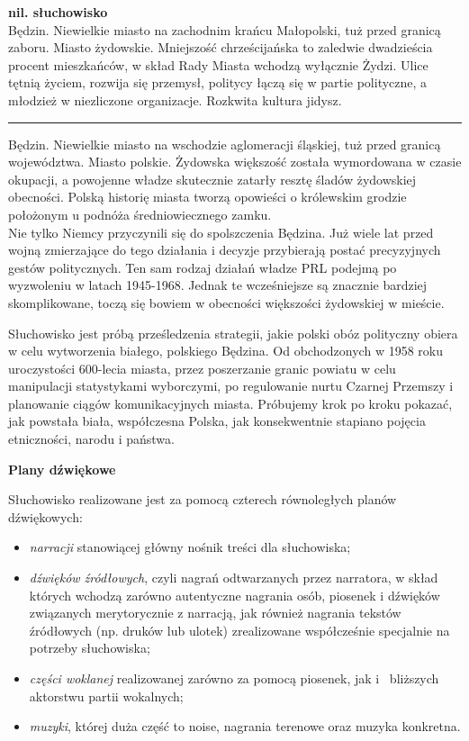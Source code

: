 \documentclass[11pt,a4paper,oneside]{article}
\begin{document}
\textbf{nil. słuchowisko}
\\

Będzin. Niewielkie miasto na zachodnim krańcu Małopolski, tuż przed
granicą zaboru. Miasto żydowskie. Mniejszość chrześcijańska to zaledwie
dwadzieścia procent mieszkańców, w skład Rady Miasta wchodzą wyłącznie
Żydzi. Ulice tętnią życiem, rozwija się przemysł, politycy łączą się w
partie polityczne, a młodzież w niezliczone organizacje. Rozkwita
kultura jidysz.

\begin{center}\rule{3in}{0.4pt}\end{center}

Będzin. Niewielkie miasto na wschodzie aglomeracji śląskiej, tuż przed
granicą województwa. Miasto polskie. Żydowska większość została
wymordowana w czasie okupacji, a powojenne władze skutecznie zatarły
resztę śladów żydowskiej obecności. Polską historię miasta tworzą
opowieści o królewskim grodzie położonym u podnóża średniowiecznego
zamku.
\\

\vspace{2em}
Nie tylko Niemcy przyczynili się do spolszczenia Będzina. Już wiele lat
przed wojną zmierzające do tego działania i decyzje przybierają postać
precyzyjnych gestów politycznych. Ten sam rodzaj działań władze PRL
podejmą po wyzwoleniu w latach 1945-1968. Jednak te wcześniejsze są
znacznie bardziej skomplikowane, toczą się bowiem w obecności większości
żydowskiej w mieście.

\hspace{1em}Słuchowisko jest próbą prześledzenia strategii, jakie polski obóz
polityczny obiera w celu wytworzenia białego, polskiego Będzina. Od
obchodzonych w 1958 roku uroczystości 600-lecia miasta, przez
poszerzanie granic powiatu w celu manipulacji statystykami wyborczymi,
po regulowanie nurtu Czarnej Przemszy i planowanie ciągów
komunikacyjnych miasta. Próbujemy krok po kroku pokazać, jak powstała
biała, współczesna Polska, jak konsekwentnie stapiano pojęcia
etniczności, narodu i państwa.


\pagebreak
\textbf{Plany dźwiękowe}

Słuchowisko realizowane jest za pomocą czterech równoległych planów
dźwiękowych:

\begin{itemize}
\item
  \emph{narracji} stanowiącej główny nośnik treści dla słuchowiska;
\item
  \emph{dźwięków źródłowych}, czyli nagrań odtwarzanych przez narratora,
  w skład których wchodzą zarówno autentyczne nagrania osób, piosenek i
  dźwięków związanych merytorycznie z narracją, jak również nagrania
  tekstów źródłowych (np. druków lub ulotek) zrealizowane współcześnie
  specjalnie na potrzeby słuchowiska;
\item
  \emph{części woklanej} realizowanej zarówno za pomocą piosenek, jak i~
  bliższych aktorstwu partii wokalnych;
\item
  \emph{muzyki}, której duża część to noise, nagrania terenowe oraz
  muzyka konkretna.
\end{itemize}
\end{document}
